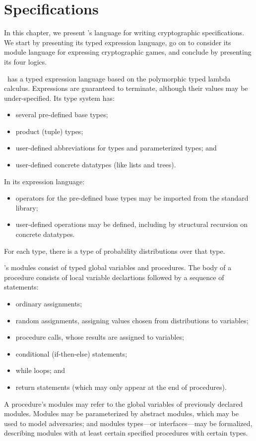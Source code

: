 \chapter{Specifications}
\label{Specifications}

In this chapter, we present \EasyCrypt's language for writing
cryptographic specifications.  We start by presenting its typed
expression language, go on to consider its module language for
expressing cryptographic games, and conclude by presenting its four
logics.

\EasyCrypt\ has a typed expression language based on the polymorphic
typed lambda calculus. Expressions are guaranteed to terminate,
although their values may be under-specified.  Its type system has:
\begin{itemize}
\item several pre-defined base types;

\item product (tuple) types;

\item user-defined abbreviations for types and parameterized types; and

\item user-defined concrete datatypes (like lists and trees).
\end{itemize}
In its expression language:
\begin{itemize}
\item operators for the pre-defined base types may be imported from
  the standard library;

\item user-defined operations may be defined, including by
  structural recursion on concrete datatypes.
\end{itemize}
For each type, there is a type of probability distributions over that
type.

\EasyCrypt's modules consist of typed global variables and procedures.
The body of a procedure consists of local variable declartions followed
by a sequence of statements:
\begin{itemize}
\item ordinary assignments;

\item random assignments, assigning values chosen
  from distributions to variables;

\item procedure calls, whose results are assigned to variables;

\item conditional (if-then-else) statements;

\item while loops; and

\item return statements (which may only appear at the end of
  procedures).
\end{itemize}
A procedure's modules may refer to the global variables of previously
declared modules. Modules may be parameterized by abstract modules,
which may be used to model adversaries; and modules types---or
interfaces---may be formalized, describing modules with at least
certain specified procedures with certain types.

